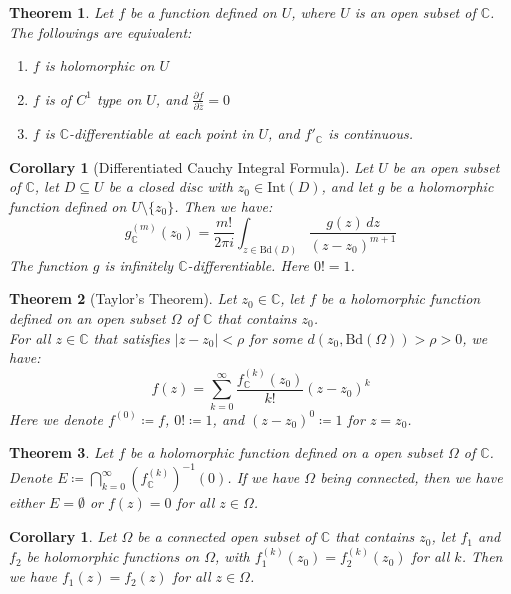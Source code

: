 \documentclass[9pt]{article}
\theoremstyle{break}
\theoremstyle{break}
\newtheorem{thm}{Theorem}[section]
\newtheorem{corT}[lem]{Corollary}
\newcommand{\Int}{\text{Int}}
\newcommand{\Bd}{\text{Bd}}
\newcommand{\Complex}{\mathbb{C}}
\newcommand{\pd}{\partial}
\begin{document}
\begin{thm}
Let $f$ be a function defined on $U$, where $U$ is an open subset of $\Complex$. The followings are equivalent:
\begin{enumerate}[topsep=3pt,itemsep=-1ex,partopsep=1ex,parsep=1ex]
\item $f$ is holomorphic on $U$
\item $f$ is of $C^1$ type on $U$, and $\frac{\pd f}{\pd \bar{z}} = 0$ 
\item $f$ is $\Complex$-differentiable at each point in $U$, and $f'_{\Complex}$ is continuous. 
\end{enumerate}
\end{thm}


\begin{corT}[Differentiated Cauchy Integral Formula]
Let $U$ be an open subset of $\Complex$, let $D\subseteq U$ be a closed disc with $z_0 \in \Int(D)$, and let $g$ be a holomorphic function defined on $U \setminus \{ z_0\}$. Then we have:
$$g^{(m)}_{\Complex}(z_0) = \frac{m!}{2\pi i}\int_{z\in \Bd(D)}\frac{g(z)\, dz}{(z-z_0)^{m+1}}$$
The function $g$ is infinitely $\Complex$-differentiable. Here $0! = 1$.
\end{corT}

\begin{thm}[Taylor's Theorem]
Let $z_0 \in \Complex$, let $f$ be a holomorphic function defined on an open subset $\Omega$ of $\Complex$ that contains $z_0$. \\For all $z \in \Complex$ that satisfies $|z-z_0|<\rho$ for some $d(z_0, \Bd(\Omega))>\rho >0$, we have:
$$f(z) = \sum_{k=0}^\infty \frac{f^{(k)}_{\Complex}(z_0)}{k!}(z-z_0)^k$$
Here we denote $f^{(0)} \coloneqq f$, $0!\coloneqq 1$, and $(z-z_0)^0 \coloneqq 1$ for $z= z_0$. 
\end{thm}
\begin{thm}
Let $f$ be a holomorphic function defined on a open subset $\Omega$ of $\Complex$. Denote $E \coloneqq  \bigcap_{k=0}^\infty (f_{\Complex}^{(k)})^{-1}(0)$. If we have $\Omega$ being connected, then we have either $E = \emptyset$ or $f(z)= 0$ for all $z\in \Omega$. 
\end{thm}

\begin{corT}
Let $\Omega$ be a connected open subset of $\Complex$ that contains $z_0$, let $f_1$ and $f_2$ be holomorphic functions on $\Omega$, with $f_1^{(k)}(z_0) = f_2^{(k)}(z_0)$ for all $k$. 	Then we have $f_1(z) = f_2(z)$ for all $z \in \Omega$. 
\end{corT}
\end{document}
